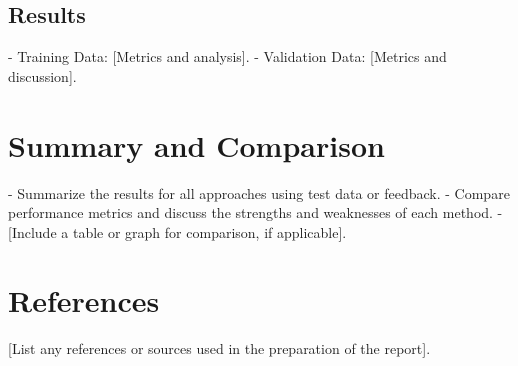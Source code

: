 \documentclass[a4paper,10pt]{article}
\begin{document}
\subsection{Results}
- Training Data: [Metrics and analysis].
- Validation Data: [Metrics and discussion].

\section{Summary and Comparison}
- Summarize the results for all approaches using test data or feedback.
- Compare performance metrics and discuss the strengths and weaknesses of each method.
- [Include a table or graph for comparison, if applicable].

\section*{References}
[List any references or sources used in the preparation of the report].
\end{document}

